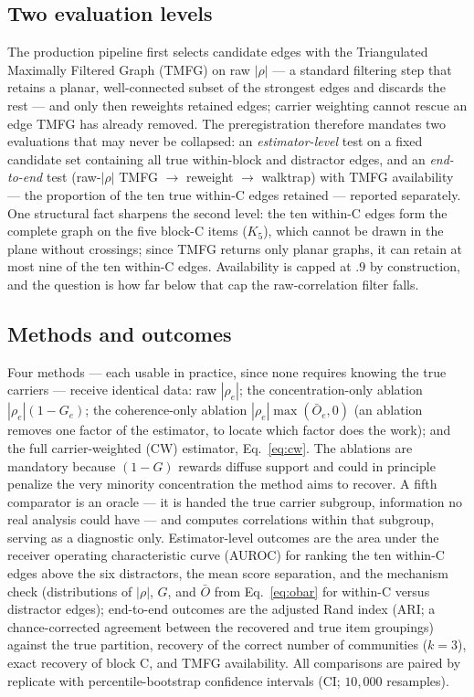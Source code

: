 \documentclass[11pt]{article}
\newcommand{\Obar}{\bar{O}}
\begin{document}
\subsection{Two evaluation levels}
The production pipeline first selects candidate edges with the Triangulated
Maximally Filtered Graph (TMFG) on raw
$|\rho|$ \citep{massara2016} --- a standard filtering step that retains a
planar, well-connected subset of the strongest edges and discards the rest
--- and only then reweights retained edges;
carrier weighting cannot rescue an edge TMFG has already removed. The
preregistration therefore mandates two evaluations that may never be
collapsed: an \emph{estimator-level} test on a fixed candidate set
containing all true within-block and distractor edges, and an
\emph{end-to-end} test (raw-$|\rho|$ TMFG $\to$ reweight $\to$ walktrap)
with TMFG availability --- the proportion of the ten true within-C edges retained
--- reported separately. One structural fact sharpens the second level:
the ten within-C edges form the complete graph on the five block-C items
($K_5$), which cannot be drawn in the plane without crossings; since TMFG
returns only planar graphs, it can retain at most nine of the ten
within-C edges. Availability is capped at $.9$ by construction, and the
question is how far below that cap the raw-correlation filter falls.

\subsection{Methods and outcomes}
Four methods --- each usable in practice, since none requires knowing the
true carriers --- receive identical data: raw $|\rho_e|$; the
concentration-only ablation $|\rho_e|(1-G_e)$; the coherence-only ablation
$|\rho_e|\max(\Obar_e,0)$ (an ablation removes one factor of the
estimator, to locate which factor does the work); and the full
carrier-weighted (CW) estimator,
Eq.~\eqref{eq:cw}. The ablations
are mandatory because $(1-G)$ rewards diffuse support and could in
principle penalize the very minority concentration the method aims to
recover. A fifth comparator is an oracle --- it is handed the true carrier
subgroup, information no real analysis could have --- and computes
correlations within that subgroup, serving as a diagnostic only. Estimator-level
outcomes are the area under the receiver operating characteristic curve
(AUROC) for ranking the ten within-C edges above the six
distractors, the mean score separation, and the mechanism check
(distributions of $|\rho|$, $G$, and $\Obar$ from Eq.~\eqref{eq:obar} for
within-C versus distractor edges);
end-to-end outcomes are the adjusted Rand index (ARI; a chance-corrected
agreement between the recovered and true item groupings) against the true
partition, recovery of the correct number of communities ($k{=}3$),
exact recovery of block C, and TMFG availability. All comparisons are
paired by replicate with percentile-bootstrap confidence intervals (CI;
$10{,}000$ resamples).
\end{document}

